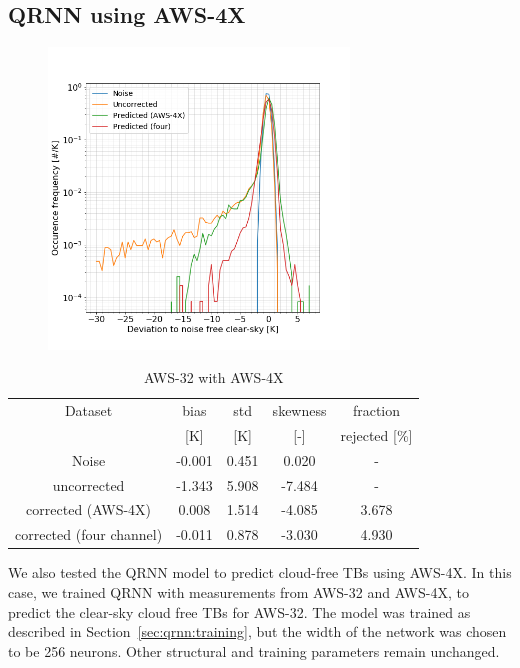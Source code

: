 \documentclass[12pt]{article}
\begin{document}
\subsection{QRNN using AWS-4X}
%
\begin{figure}[!tb]
	\centering
	\includegraphics[height=80mm]{Channel_C32_C4X.png}
	\caption{ }
	\label{fig:qrnn_C32_C4X:deviations}
\end{figure}

\begin{table}[!tb]
	\centering
	\begin{tabular}[b]{c|c|c|c|c}
		Dataset  		  &   bias &   std &   skewness & fraction  \\
		&   [K]  &   [K] & [-] & rejected [\%]\\
		\hline
		Noise                      & -0.001 & 0.451 &              0.020 &      - \\
		uncorrected                & -1.343 & 5.908 &             -7.484 &      - \\
		corrected (AWS-4X)         &  0.008 & 1.514 &             -4.085 &      3.678 \\
		corrected (four channel)   & -0.011 & 0.878 &             -3.030 &      4.930 \\
		\hline
	\end{tabular}
	\caption{ AWS-32 with AWS-4X}
	\label{tab:qrnn:C32:C4X}
\end{table} 
We also tested the QRNN model to predict cloud-free TBs using AWS-4X. In this case, we trained QRNN with measurements from AWS-32 and AWS-4X, to predict the clear-sky cloud free TBs for AWS-32. The model was trained as described in Section~\ref{sec:qrnn:training}, but the width of the network was chosen to be 256 neurons. Other structural and training parameters remain unchanged.
\end{document}
